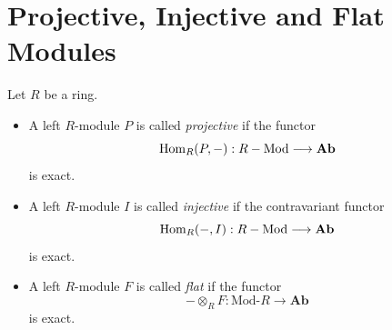\section{Projective, Injective and Flat Modules}

\begin{definition}
    Let $R$ be a ring.
    \begin{itemize}
        \item A left $R$-module $P$ is called \emph{projective} if the functor
              \[
                  \mathrm{Hom}_R(P,-): R-\mathrm{Mod}\longrightarrow \mathbf{Ab}
              \]
              is exact.
        \item A left $R$-module $I$ is called \emph{injective} if the contravariant functor
              \[
                  \mathrm{Hom}_R(-,I): R-\mathrm{Mod}\longrightarrow \mathbf{Ab}
              \]
              is exact.
        \item A left $R$-module $F$ is called \emph{flat} if the functor
              \[
                  -\otimes_R F:\mathrm{Mod}\text{-}R\longrightarrow \mathbf{Ab}
              \]
              is exact.
    \end{itemize}
\end{definition}

